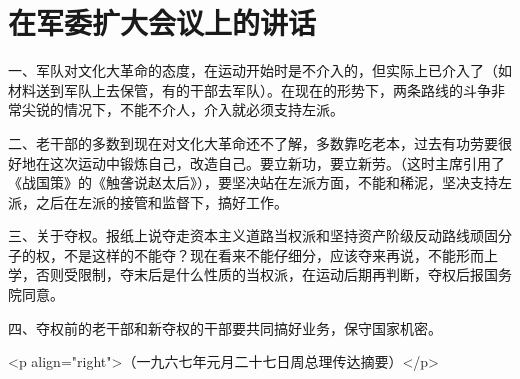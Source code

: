 \section[在军委扩大会议上的讲话（一九六七年一月二十七日）]{在军委扩大会议上的讲话}


一、军队对文化大革命的态度，在运动开始时是不介入的，但实际上已介入了（如材料送到军队上去保管，有的干部去军队）。在现在的形势下，两条路线的斗争非常尖锐的情况下，不能不介人，介入就必须支持左派。

二、老干部的多数到现在对文化大革命还不了解，多数靠吃老本，过去有功劳要很好地在这次运动中锻炼自己，改造自己。要立新功，要立新劳。（这时主席引用了《战国策》的《触詟说赵太后》），要坚决站在左派方面，不能和稀泥，坚决支持左派，之后在左派的接管和监督下，搞好工作。

三、关于夺权。报纸上说夺走资本主义道路当权派和坚持资产阶级反动路线顽固分子的权，不是这样的不能夺？现在看来不能仔细分，应该夺来再说，不能形而上学，否则受限制，夺末后是什么性质的当权派，在运动后期再判断，夺权后报国务院同意。

四、夺权前的老干部和新夺权的干部要共同搞好业务，保守国家机密。

<p align="right">（一九六七年元月二十七日周总理传达摘要）</p>


